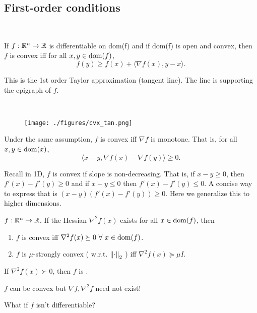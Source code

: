 \documentclass[class=article,crop=false]{standalone}
\begin{document}
\subsection{First-order conditions}

~\begin{thm}
	If $ f: \mathbb{R}^{n} \to \mathbb{R}$ is differentiable on dom(f) and if dom(f) is open and convex, then $ f$ is convex iff for all  $ x,y \in \operatorname{dom}(f)$,
	\[
		f(y) \geq f(x) + \langle \nabla f(x),y-x \rangle
	.\] 
\end{thm}
\begin{note}
	This is the 1st order Taylor approximation (tangent line). The line is supporting the epigraph of $ f$.
\end{note}
~\begin{figure}[H]
	\centering
	\texttt{[image: ./figures/cvx\_tan.png]}
\end{figure}
\begin{thm}
	Under the same assumption, $ f$ is convex iff $\nabla  f$ is monotone. That is, for all $ x,y \in \operatorname{dom}(x)$,
	\[
		\langle x-y, \nabla f(x) - \nabla f(y) \rangle \geq 0
	.\] 
\end{thm}
\begin{intuition}
	Recall in 1D, $ f$ is convex if slope is non-decreasing. That is, if $ x-y\geq 0$, then  $ f'(x) - f'(y) \geq 0$ and if $ x-y \leq 0$ then  $ f'(x)-f'(y)\leq 0$. A concise way to express that is $ (x-y)(f'(x) - f'(y)) \geq 0$. Here we generalize this to higher dimensions.
\end{intuition}

\begin{thm}
	$ f: \mathbb{R}^{n} \to \mathbb{R}$. If the Hessian $ \nabla^2 f(x)$ exists for all $ x \in \operatorname{dom}(f)$, then
	\begin{enumerate}[label=\alph*)]
		\item $ f$ is convex iff  $ \nabla ^2 f(x) \succeq 0 \ \forall \ x \in \dom(f)$.
		\item $ f$ is  $ \mu$-strongly convex ( w.r.t. $ {\left\lVert{ \cdot }\right\rVert}_2 $ ) iff $ \nabla ^2 f(x) \succeq \mu I$.
	\end{enumerate}
	If $ \nabla ^2 f(x) \succ 0$, then $ f$ is . 
\end{thm}
\begin{remark}
$ f$ can be convex but  $ \nabla f, \nabla ^2 f$ need not exist!
\end{remark}
What if $ f$ isn't differentiable?
\end{document}
